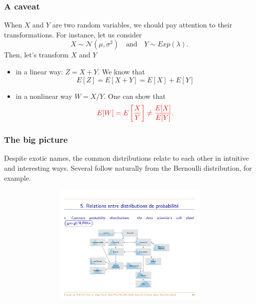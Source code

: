 \documentclass[notes=show,smaller,handout]{beamer}
\begin{document}
\begin{frame}
\frametitle{A caveat }

When $X$ and $Y$ are two random variables, we should pay attention to their transformations. For instance, let us consider
$$
X\sim \mathcal{N}(\mu,\sigma^2) \quad \text{and}  \quad Y\sim Exp(\lambda).
$$ 
Then, let's transform $X$ and $Y$

\begin{itemize}
\item  in a linear way: $Z=X+Y$. We know that 
$$
E[Z] = E[X+Y] = E[X] + E[Y] 
$$
\item in a nonlinear way $W = X/Y$. One can show that
$$\color{red}
E[W] = E\left[\frac{X}{Y}\right] \neq \frac{E[X]}{E[Y]}. \color{black}
$$
 \end{itemize}
\end{frame}

\begin{frame}
\frametitle{The big picture}

Despite exotic names, the common distributions relate to each other in intuitive and interesting ways. Several follow naturally from the Bernoulli distribution, for example. 

\begin{figure}[ptb]\centering
\includegraphics[height=2.3in, width=4.5in]{RelRVs_Diego.pdf}%
\end{figure}%

\end{frame}
\end{document}
